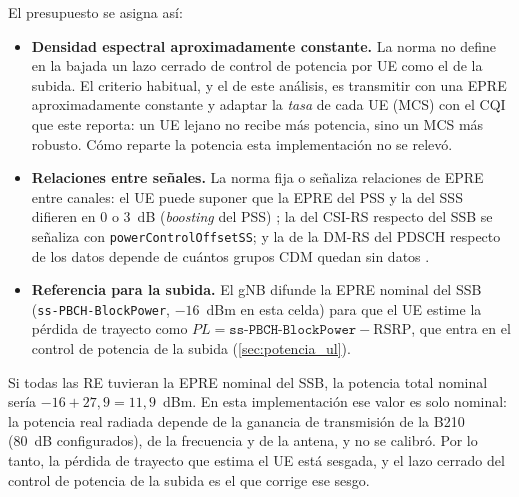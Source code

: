 El presupuesto se asigna así:
\begin{itemize}
  \item \textbf{Densidad espectral aproximadamente constante.} La norma no define en la bajada un lazo cerrado de control de potencia por UE como el de la subida. El criterio habitual, y el de este análisis, es transmitir con una EPRE aproximadamente constante y adaptar la \emph{tasa} de cada UE (MCS) con el CQI que este reporta: un UE lejano no recibe más potencia, sino un MCS más robusto. Cómo reparte la potencia esta implementación no se relevó.
  \item \textbf{Relaciones entre señales.} La norma fija o señaliza relaciones de EPRE entre canales: el UE puede suponer que la EPRE del PSS y la del SSS difieren en 0 o 3~dB (\emph{boosting} del PSS) \cite[§4.1]{ts38213}; la del CSI-RS respecto del SSB se señaliza con \texttt{powerControlOffsetSS}; y la de la DM-RS del PDSCH respecto de los datos depende de cuántos grupos CDM quedan sin datos \cite[§4.1, tabla~4.1-1]{ts38214}.
  \item \textbf{Referencia para la subida.} El gNB difunde la EPRE nominal del SSB (\texttt{ss-PBCH-BlockPower}, $-16$~dBm en esta celda) para que el UE estime la pérdida de trayecto como $PL = \texttt{ss-PBCH-BlockPower} - \text{RSRP}$, que entra en el control de potencia de la subida (\cref{sec:potencia_ul}).
\end{itemize}
Si todas las RE tuvieran la EPRE nominal del SSB, la potencia total nominal sería $-16 + 27{,}9 = 11{,}9$~dBm. En esta implementación ese valor es solo nominal: la potencia real radiada depende de la ganancia de transmisión de la B210 (80~dB configurados), de la frecuencia y de la antena, y no se calibró. Por lo tanto, la pérdida de trayecto que estima el UE está sesgada, y el lazo cerrado del control de potencia de la subida es el que corrige ese sesgo.
